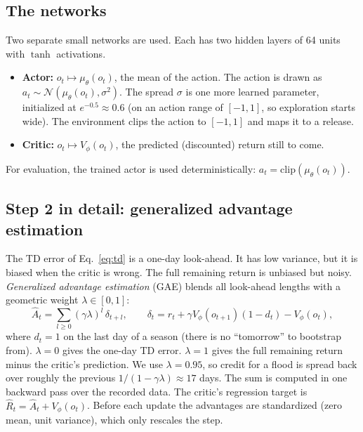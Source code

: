 \subsection{The networks}
Two separate small networks are used. Each has two hidden layers of 64
units with $\tanh$ activations.
\begin{itemize}\itemsep1pt
\item \textbf{Actor:} $o_t\mapsto\mu_\theta(o_t)$, the mean of the action.
The action is drawn as $a_t\sim\mathcal N(\mu_\theta(o_t),\sigma^2)$. The
spread $\sigma$ is one more learned parameter, initialized at
$e^{-0.5}\approx0.6$ (on an action range of $[-1,1]$, so exploration starts
wide). The environment clips the action to $[-1,1]$ and maps it to a
release.
\item \textbf{Critic:} $o_t\mapsto V_\phi(o_t)$, the predicted
(discounted) return still to come.
\end{itemize}
For evaluation, the trained actor is used deterministically:
$a_t=\mathrm{clip}(\mu_\theta(o_t))$.

\subsection{Step 2 in detail: generalized advantage estimation}
The TD error of Eq.~\eqref{eq:td} is a one-day look-ahead. It has low
variance, but it is biased when the critic is wrong. The full remaining
return is unbiased but noisy. \emph{Generalized advantage estimation} (GAE)
\cite{schulman2016gae} blends all look-ahead lengths with a geometric
weight $\lambda\in[0,1]$:
\begin{equation}
\hat A_t=\sum_{l\ge0}(\gamma\lambda)^l\,\delta_{t+l},\qquad
\delta_t=r_t+\gamma V_\phi(o_{t+1})(1-d_t)-V_\phi(o_t),
\label{eq:gae}
\end{equation}
where $d_t=1$ on the last day of a season (there is no ``tomorrow'' to
bootstrap from). $\lambda=0$ gives the one-day TD error. $\lambda=1$ gives
the full remaining return minus the critic's prediction. We use
$\lambda=0.95$, so credit for a flood is spread back over roughly the
previous $1/(1-\gamma\lambda)\approx17$ days. The sum is computed in one
backward pass over the recorded data. The critic's regression target is
$\hat R_t=\hat A_t+V_\phi(o_t)$. Before each update the advantages are
standardized (zero mean, unit variance), which only rescales the step.

